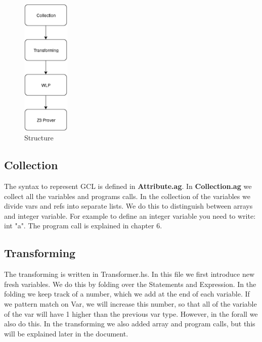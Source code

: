 \documentclass{article}
\begin{document}
\begin{figure}
  \begin{center}
    \includegraphics[width=0.20\textwidth]{Architecture1.png}
  \end{center}
  \caption{Structure}
\end{figure}

\subsection{Collection}
The syntax to represent GCL is defined in \textbf{Attribute.ag}. In \textbf{Collection.ag} we collect all the variables and programs calls. In the collection of the variables we divide vars and refs into separate lists. We do this to distinguish between arrays and integer variable. For example to define an integer variable you need to write: int "a". The program call is explained in chapter 6.

\subsection{Transforming}
The transforming is written in Transformer.hs. In this file we first introduce new fresh variables. We do this by folding over the Statements and Expression. In the folding we keep track of a number, which we add at the end of each variable. If we pattern match on Var, we will increase this number, so that all of the variable of the var will have 1 higher than the previous var type. However, in the forall we also do this. In the transforming we also added array and program calls, but this will be explained later in the document.
\end{document}
